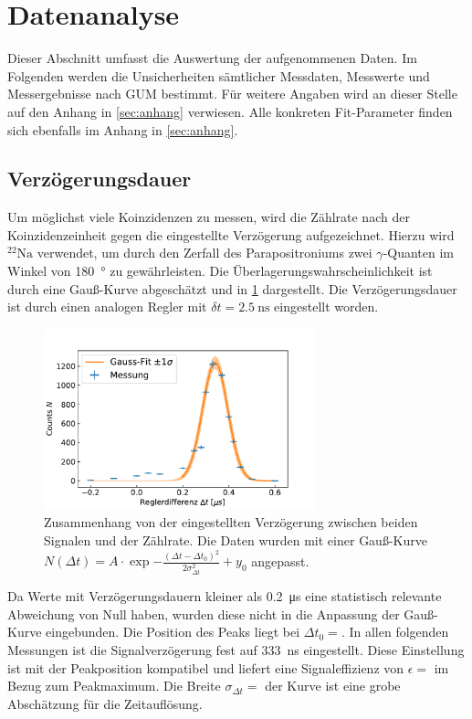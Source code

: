 \section{Datenanalyse}

	Dieser Abschnitt umfasst die Auswertung der aufgenommenen Daten.
	Im Folgenden werden die Unsicherheiten sämtlicher Messdaten, Messwerte und Messergebnisse nach GUM\cite{1} bestimmt.
	Für weitere Angaben wird an dieser Stelle auf den Anhang in \cref{sec:anhang} verwiesen.
	Alle konkreten Fit-Parameter finden sich ebenfalls im Anhang in \cref{sec:anhang}.

\subsection{Verzögerungsdauer}
	
	Um möglichst viele Koinzidenzen zu messen, wird die Zählrate nach der Koinzidenzeinheit gegen die eingestellte Verzögerung aufgezeichnet.
	Hierzu wird $^{22}\text{Na}$ verwendet, um durch den Zerfall des Parapositroniums zwei $\gamma$-Quanten im Winkel von \SI{180}{\degree} zu gewährleisten.
	Die Überlagerungswahrscheinlichkeit ist durch eine Gauß-Kurve abgeschätzt und in \cref{fig:zeitdiff} dargestellt.
	Die Verzögerungsdauer ist durch einen analogen Regler mit $\delta t = \SI{2.5}{\nano\second}$ eingestellt worden.
	\begin{figure}[ht]
		\centering
		\includegraphics[width=0.7\textwidth]{dat/zeitdifferenz.pdf}
		\caption{Zusammenhang von der eingestellten Verzögerung zwischen beiden Signalen und der Zählrate.
			Die Daten wurden mit einer Gauß-Kurve \\$N(\Delta t) =  A \cdot \exp{-\frac{(\Delta t - \Delta t_0)^2}{2 \sigma_{\Delta t}^2}} + y_0$ angepasst.}
		\label{fig:zeitdiff}
	\end{figure}
	Da Werte mit Verzögerungsdauern kleiner als \SI{0.2}{\micro\second} eine statistisch relevante Abweichung von Null haben, wurden diese nicht in die Anpassung der Gauß-Kurve eingebunden.
	Die Position des Peaks liegt bei $\Delta t_0 = $.
	In allen folgenden Messungen ist die Signalverzögerung fest auf \SI{333}{\nano\second} eingestellt.
	Diese Einstellung ist mit der Peakposition kompatibel und liefert eine Signaleffizienz von $\epsilon = $ im Bezug zum Peakmaximum.
	Die Breite $\sigma_{\Delta t} = $ der Kurve ist eine grobe Abschätzung für die Zeitauflösung.
	
